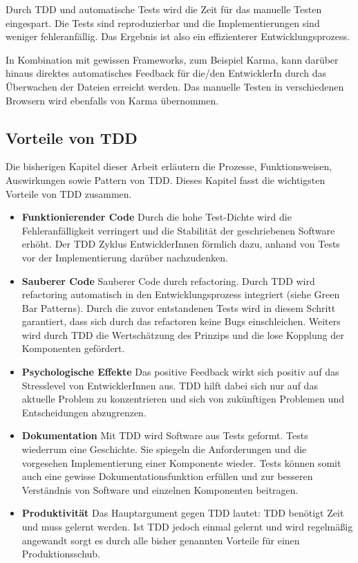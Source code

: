 Durch TDD und automatische Tests wird die Zeit für das manuelle Testen eingespart. Die Tests sind reproduzierbar und die Implementierungen sind weniger fehleranfällig. Das Ergebnis ist also ein effizienterer Entwicklungsprozess.

In Kombination mit gewissen Frameworks, zum Beispiel Karma, kann darüber hinaus direktes automatisches Feedback für die/den EntwicklerIn durch das Überwachen der Dateien erreicht werden. Das manuelle Testen in verschiedenen Browsern wird ebenfalls von Karma übernommen.

\subsection{Vorteile von TDD}
\label{Vorteile von TDD}
Die bisherigen Kapitel dieser Arbeit erläutern die Prozesse, Funktionsweisen, Auswirkungen sowie Pattern von TDD. Dieses Kapitel fasst die wichtigsten Vorteile von TDD zusammen.
\begin{itemize}
  \item \textbf{Funktionierender Code}\newline
  Durch die hohe Test-Dichte wird die Fehleranfälligkeit verringert und die Stabilität der geschriebenen Software erhöht. Der TDD Zyklus  EntwicklerInnen förmlich dazu, anhand von Tests vor der Implementierung darüber nachzudenken.
  \item \textbf{Sauberer Code}\newline
  Sauberer Code durch refactoring. Durch TDD wird refactoring automatisch in den Entwicklungsprozess integriert (siehe Green Bar Patterns). Durch die zuvor entstandenen Tests wird in diesem Schritt garantiert, dass sich durch das refactoren keine Bugs einschleichen. Weiters wird durch TDD die Wertschätzung des  Prinzips und die lose Kopplung der Komponenten gefördert\autocite[30]{Johansen:2011}.
  \item \textbf{Psychologische Effekte}\newline
  Das positive Feedback wirkt sich positiv auf das Stresslevel von EntwicklerInnen aus.
  TDD hilft dabei sich nur auf das aktuelle Problem zu konzentrieren und sich von zukünftigen Problemen und Entscheidungen abzugrenzen.
  \item \textbf{Dokumentation}\newline
  Mit TDD wird Software aus Tests geformt. Tests wiederrum  eine Geschichte. Sie spiegeln die Anforderungen und die vorgesehen Implementierung einer Komponente wieder. Tests können somit auch eine gewisse Dokumentationsfunktion erfüllen und zur besseren Verständnis von Software und einzelnen Komponenten beitragen.
  \item \textbf{Produktivität}\newline
  Das Hauptargument gegen TDD lautet: TDD benötigt Zeit und muss gelernt werden.
  Ist TDD jedoch einmal gelernt und wird regelmäßig angewandt sorgt es durch alle bisher genannten Vorteile für einen Produktionsschub.
\end{itemize}

